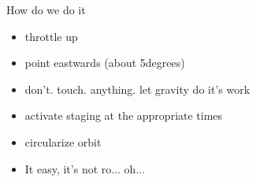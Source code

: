 {\begin{frame}
    \begin{block}{How do we do it}
        \begin{itemize}
            \item throttle up
            \item point eastwards (about 5degrees)
            \item don't. touch. anything. let gravity do it's work
            \item activate staging at the appropriate times
            \item circularize orbit
            \item It easy, it's not ro... oh...
        \end{itemize}
    \end{block}
\end{frame}
}
